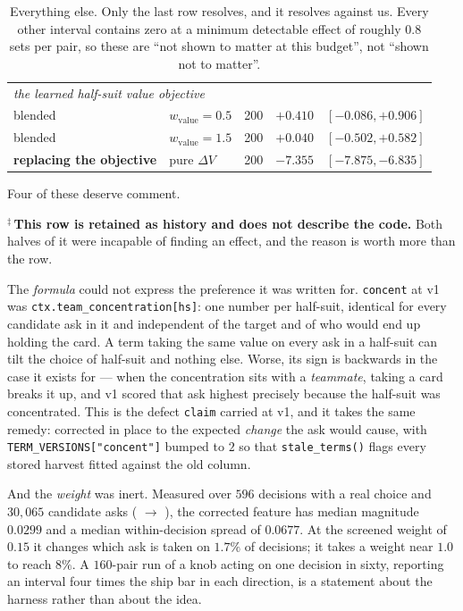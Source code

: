 \documentclass[11pt,a4paper]{article}
\begin{document}
\begin{table}[t]
\begin{tabular}{llrrl}
\midrule
\multicolumn{5}{l}{\emph{the learned half-suit value objective}}\\
blended & $w_{\mathrm{value}} = 0.5$ & 200 & $+0.410$ & $[-0.086, +0.906]$ \\
blended & $w_{\mathrm{value}} = 1.5$ & 200 & $+0.040$ & $[-0.502, +0.582]$ \\
\textbf{replacing the objective} & pure $\Delta V$ & 200 & $\mathbf{-7.355}$ & $[-7.875, -6.835]$ \\
\bottomrule
\end{tabular}
\caption{Everything else. Only the last row resolves, and it resolves against
us. Every other interval contains zero at a minimum detectable effect of
roughly $0.8$ sets per pair, so these are ``not shown to matter at this budget'',
not ``shown not to matter''.}
\label{tab:nulls}
\end{table}

Four of these deserve comment.

$^\ddagger$\,\textbf{This row is retained as history and does not describe the
code.} Both halves of it were incapable of finding an effect, and the reason is
worth more than the row.

The \emph{formula} could not express the preference it was written for.
\texttt{concent} at v1 was \texttt{ctx.team\_concentration[hs]}: one number per
half-suit, identical for every candidate ask in it and independent of the
target and of who would end up holding the card. A term taking the same value
on every ask in a half-suit can tilt the choice of half-suit and nothing else.
Worse, its sign is backwards in the case it exists for --- when the
concentration sits with a \emph{teammate}, taking a card breaks it up, and v1
scored that ask highest precisely because the half-suit was concentrated. This
is the defect \texttt{claim} carried at v1, and it takes the same remedy:
corrected in place to the expected \emph{change} the ask would cause, with
\texttt{TERM\_VERSIONS["concent"]} bumped to $2$ so that
\texttt{stale\_terms()} flags every stored harvest fitted against the old
column.

And the \emph{weight} was inert. Measured over $596$ decisions with a real
choice and $30{,}065$ candidate asks
( $\rightarrow$
), the corrected feature has median magnitude
$0.0299$ and a median within-decision spread of $0.0677$. At the screened
weight of $0.15$ it changes which ask is taken on $1.7\%$ of decisions; it
takes a weight near $1.0$ to reach $8\%$. A $160$-pair run of a knob acting on
one decision in sixty, reporting an interval four times the ship bar in each
direction, is a statement about the harness rather than about the idea.
\end{document}

